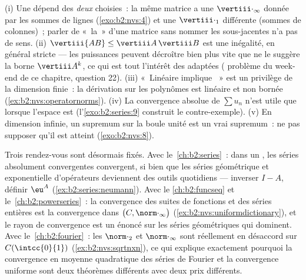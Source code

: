 \begin{remark}\label{rem:b2:nvs:pitfalls}
(i) Une  dépend des \emph{deux}  choisies~: la
même matrice a une $\vertiii\cdot_\infty$ donnée par les sommes de
lignes (\cref{exo:b2:nvs:4}) et une $\vertiii\cdot_1$ différente
(sommes de colonnes)~; parler de «~la~»  d'une matrice sans nommer
les  sous-jacentes n'a pas de sens. (ii) $\vertiii{AB} \leq
\vertiii A\,\vertiii B$ est une inégalité, en général stricte ---
les puissances peuvent décroître bien plus vite que ne le suggère la
borne $\vertiii A^k$, ce qui est tout l'intérêt des  adaptées (
problème du week-end de ce chapitre, question 22). (iii) «~Linéaire
implique ~» est un privilège de la dimension finie~: la
dérivation sur les polynômes est linéaire et non bornée
(\cref{ex:b2:nvs:operatornorms}). (iv) La convergence absolue de
$\sum u_n$ n'est utile que lorsque l'espace est 
(l'\cref{exo:b2:series:9} construit le contre-exemple). (v) En
dimension infinie, un supremum sur la boule unité est un vrai
supremum~: ne pas supposer qu'il est atteint
(\cref{exo:b2:nvs:8}).
\end{remark}

\begin{remark}\label{rem:b2:nvs:perspectives}
Trois rendez-vous sont désormais fixés. Avec le~\cref{ch:b2:series}~:
dans un , les séries absolument convergentes
convergent, si bien que les séries géométrique et exponentielle
d'opérateurs deviennent des outils quotidiens --- inverser $I - A$,
définir $\eu^{A}$ (\cref{ex:b2:series:neumann}). Avec le
\cref{ch:b2:funcseq} et le~\cref{ch:b2:powerseries}~: la convergence
des suites de fonctions et des séries entières est la convergence dans
$\bigl(C, \norm\cdot_\infty\bigr)$ (\cref{ex:b2:nvs:uniformdictionary}),
et le rayon de convergence est un énoncé sur les séries géométriques
qui dominent. Avec le~\cref{ch:b2:fourier}~: les 
$\norm\cdot_2$ et $\norm\cdot_\infty$ sont réellement en désaccord sur
$C(\intcc{0}{1})$ (\cref{ex:b2:nvs:sqrtnxn}), ce qui explique
exactement pourquoi la convergence en moyenne quadratique des séries
de Fourier et la convergence uniforme sont deux théorèmes différents
avec deux prix différents.
\end{remark}

